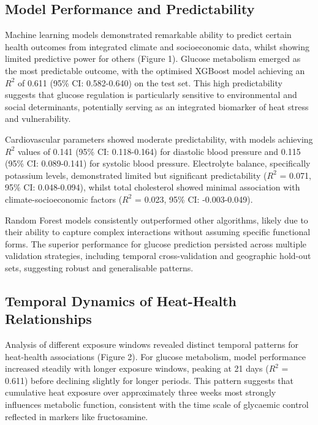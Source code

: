 \documentclass[11pt,a4paper]{article}
\begin{document}
\subsection{Model Performance and Predictability}

Machine learning models demonstrated remarkable ability to predict certain health outcomes from integrated climate and socioeconomic data, whilst showing limited predictive power for others (Figure 1). Glucose metabolism emerged as the most predictable outcome, with the optimised XGBoost model achieving an $R^2$ of 0.611 (95\% CI: 0.582-0.640) on the test set. This high predictability suggests that glucose regulation is particularly sensitive to environmental and social determinants, potentially serving as an integrated biomarker of heat stress and vulnerability.

Cardiovascular parameters showed moderate predictability, with models achieving $R^2$ values of 0.141 (95\% CI: 0.118-0.164) for diastolic blood pressure and 0.115 (95\% CI: 0.089-0.141) for systolic blood pressure. Electrolyte balance, specifically potassium levels, demonstrated limited but significant predictability ($R^2$ = 0.071, 95\% CI: 0.048-0.094), whilst total cholesterol showed minimal association with climate-socioeconomic factors ($R^2$ = 0.023, 95\% CI: -0.003-0.049).

Random Forest models consistently outperformed other algorithms, likely due to their ability to capture complex interactions without assuming specific functional forms. The superior performance for glucose prediction persisted across multiple validation strategies, including temporal cross-validation and geographic hold-out sets, suggesting robust and generalisable patterns.

\subsection{Temporal Dynamics of Heat-Health Relationships}

Analysis of different exposure windows revealed distinct temporal patterns for heat-health associations (Figure 2). For glucose metabolism, model performance increased steadily with longer exposure windows, peaking at 21 days ($R^2$ = 0.611) before declining slightly for longer periods. This pattern suggests that cumulative heat exposure over approximately three weeks most strongly influences metabolic function, consistent with the time scale of glycaemic control reflected in markers like fructosamine.
\end{document}
